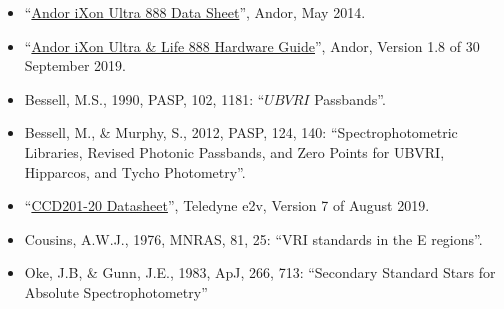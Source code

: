 \begin{flushleft}
\begin{itemize}
\item “\href{bibliography/huitzi/andor-ixon-ultra-888-data-sheet.pdf}{Andor iXon Ultra 888 Data Sheet}”, Andor, May 2014.
\item “\href{bibliography/huitzi/andor-ixon-ultra-888-hardware-guide.pdf}{Andor iXon Ultra \& Life 888 Hardware Guide}”, Andor, Version 1.8 of 30 September 2019.
\item Bessell, M.S., 1990, PASP, 102, 1181: “$UBVRI$ Passbands”.
\item Bessell, M., \& Murphy, S., 2012,  PASP, 124, 140: “Spectrophotometric Libraries, Revised Photonic Passbands, and Zero Points for UBVRI, Hipparcos, and Tycho Photometry”.
\item “\href{bibliography/huitzi/e2v-ccd201-20-datasheet.pdf}{CCD201-20 Datasheet}”, Teledyne e2v, Version 7 of August 2019.
\item Cousins, A.W.J., 1976, MNRAS, 81, 25: “VRI standards in the E regions”.
\item Oke, J.B, \& Gunn, J.E., 1983, ApJ, 266, 713: “Secondary Standard Stars for Absolute Spectrophotometry”
\end{itemize}
\end{flushleft}


